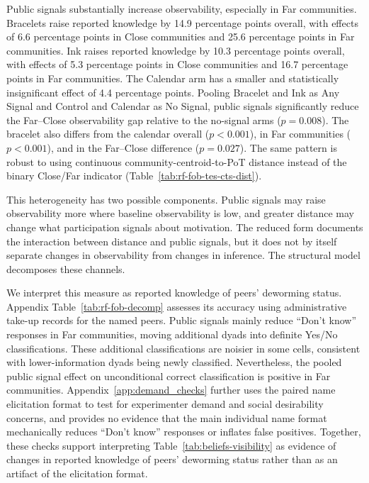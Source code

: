 \documentclass[ECM\space ReStud.tex]{subfiles}
\begin{document}
Public signals substantially increase observability, especially in Far communities. Bracelets raise reported knowledge by 14.9 percentage points overall, with effects of 6.6 percentage points in Close communities and 25.6 percentage points in Far communities. Ink raises reported knowledge by 10.3 percentage points overall, with effects of 5.3 percentage points in Close communities and 16.7 percentage points in Far communities. The Calendar arm has a smaller and statistically insignificant effect of 4.4 percentage points. Pooling Bracelet and Ink as Any Signal and Control and Calendar as No Signal, public signals significantly reduce the Far--Close observability gap relative to the no-signal arms (\(p=0.008\)). The bracelet also differs from the calendar overall (\(p<0.001\)), in Far communities (\(p<0.001\)), and in the Far--Close difference (\(p=0.027\)). The same pattern is robust to using continuous community-centroid-to-PoT distance instead of the binary Close/Far indicator (Table~\ref{tab:rf-fob-tes-cts-dist}).%

This heterogeneity has two possible components. Public signals may raise observability more where baseline observability is low, and greater distance may change what participation signals about motivation. The reduced form documents the interaction between distance and public signals, but it does not by itself separate changes in observability from changes in inference. The structural model decomposes these channels.

We interpret this measure as reported knowledge of peers' deworming status. Appendix Table~\ref{tab:rf-fob-decomp} assesses its accuracy using administrative take-up records for the named peers. Public signals mainly reduce ``Don't know'' responses in Far communities, moving additional dyads into definite Yes/No classifications. These additional classifications are noisier in some cells, consistent with lower-information dyads being newly classified. Nevertheless, the pooled public signal effect on unconditional correct classification is positive in Far communities. Appendix~\ref{app:demand_checks} further uses the paired name elicitation format to test for experimenter demand and social desirability concerns, and provides no evidence that the main individual name format mechanically reduces ``Don't know'' responses or inflates false positives. Together, these checks support interpreting Table~\ref{tab:beliefs-visibility} as evidence of changes in reported knowledge of peers' deworming status rather than as an artifact of the elicitation format.
\end{document}
